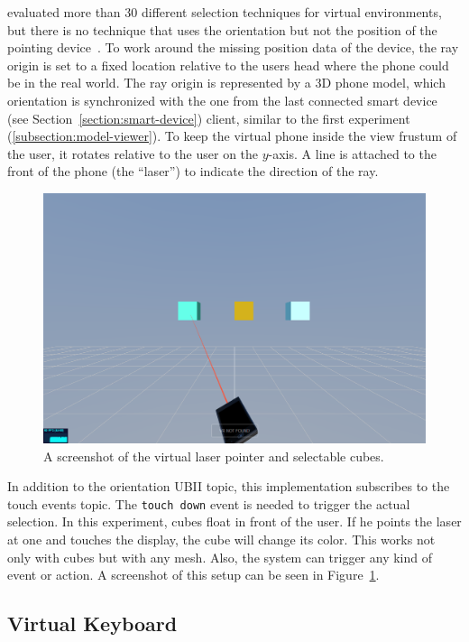 \citeauthor{Argelaguet.2013} evaluated more than 30 different selection techniques for virtual environments, but there is no technique that uses the orientation but not the position of the pointing device~\cite[Table 1]{Argelaguet.2013}. To work around the missing position data of the device, the ray origin is set to a fixed location relative to the users head where the phone could be in the real world. The ray origin is represented by a \ac{3D} phone model, which orientation is synchronized with the one from the last connected smart device (see Section~\ref{section:smart-device}) client, similar to the first experiment (\ref{subsection:model-viewer}). To keep the virtual phone inside the view frustum of the user, it rotates relative to the user on the \(y\)-axis.
A line is attached to the front of the phone (the \enquote{laser}) to indicate the direction of the ray.

\begin{figure}[H]
  \centering
  \includegraphics[width=12cm]{figures/screenshot_exp_lp.png}
  \caption[Screenshot of the laser pointer experiment]{A screenshot of the virtual laser pointer and selectable cubes.}\label{fig:screenshot-exp-lp}
\end{figure}

In addition to the orientation \ac{UBII} topic, this implementation subscribes to the touch events topic. The \lstinline{touch down} event is needed to trigger the actual selection.
In this experiment, cubes float in front of the user. If he points the laser at one and touches the display, the cube will change its color. This works not only with cubes but with any mesh. Also, the system can trigger any kind of event or action. A screenshot of this setup can be seen in Figure~\ref{fig:screenshot-exp-lp}.


\subsection{Virtual Keyboard}\label{subsection:virtual-keyboard}

